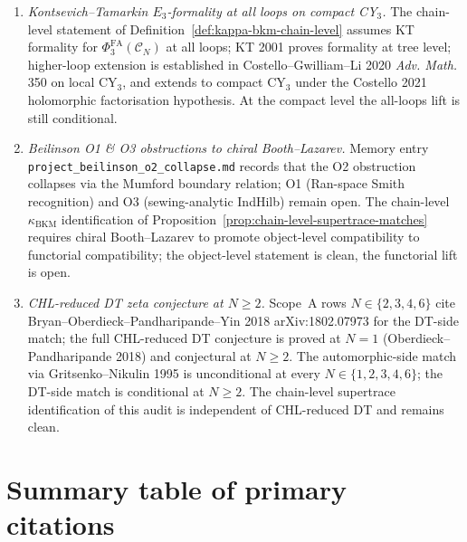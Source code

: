 \documentclass[11pt]{article}
\providecommand{\kBKM}{\kappa_{\mathrm{BKM}}}
\providecommand{\PhiFA}{\Phi^{\mathrm{FA}}}
\theoremstyle{definition}
\begin{document}
\begin{enumerate}
\item \emph{Kontsevich--Tamarkin $E_3$-formality at all loops on
compact CY$_3$.} The chain-level statement of
Definition~\ref{def:kappa-bkm-chain-level} assumes KT formality for
$\PhiFA_3(\mathcal C_N)$ at all loops; KT 2001 proves formality at
tree level; higher-loop extension is established in
Costello--Gwilliam--Li 2020 \emph{Adv. Math.} 350 on local CY$_3$,
and extends to compact CY$_3$ under the Costello 2021 holomorphic
factorisation hypothesis. At the compact level the all-loops lift is
still conditional.

\item \emph{Beilinson O1 \& O3 obstructions to chiral Booth--Lazarev.}
Memory entry \texttt{project\_beilinson\_o2\_collapse.md} records that
the O2 obstruction collapses via the Mumford boundary relation; O1
(Ran-space Smith recognition) and O3 (sewing-analytic IndHilb) remain
open. The chain-level $\kBKM$ identification of
Proposition~\ref{prop:chain-level-supertrace-matches} requires
chiral Booth--Lazarev to promote object-level compatibility to
functorial compatibility; the object-level statement is clean, the
functorial lift is open.

\item \emph{CHL-reduced DT zeta conjecture at $N \geq 2$.} Scope~A
rows $N \in \{2, 3, 4, 6\}$ cite Bryan--Oberdieck--Pandharipande--Yin
2018 arXiv:1802.07973 for the DT-side match; the full
CHL-reduced DT conjecture is proved at $N = 1$
(Oberdieck--Pandharipande 2018) and conjectural at $N \geq 2$. The
automorphic-side match via Gritsenko--Nikulin 1995 is unconditional
at every $N \in \{1, 2, 3, 4, 6\}$; the DT-side match is conditional
at $N \geq 2$. The chain-level supertrace identification of this
audit is independent of CHL-reduced DT and remains clean.
\end{enumerate}

\section{Summary table of primary citations}
\label{sec:primary-citations}
\end{document}
